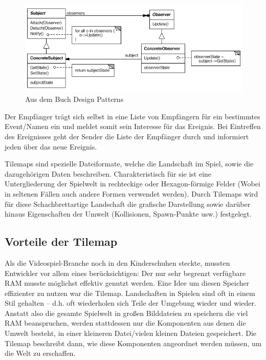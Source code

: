 \begin{figure}[H]
 \centering
  \includegraphics[width=15cm]{resources/observer_pattern}
  \caption{Aus dem Buch Design Patterns \cite[Seite 326ff]{gamma2011patterns}}
  \label{fig:observer_pattern} 
\end{figure}

Der Empfänger trägt sich selbst in eine Liste von Empfängern für ein bestimmtes Event/Namen ein und meldet somit sein Interesse für das Ereignis. Bei Eintreffen des Ereignisses geht der Sender die Liste der Empfänger durch und informiert jeden über das neue Ereignis.



\label{sec:2_Tilemaps}

Tilemaps  sind spezielle Dateiformate, welche die Landschaft im Spiel, sowie die dazugehörigen Daten beschreiben. Charakteristisch für sie ist eine Untergliederung der Spielwelt in rechteckige oder Hexagon-förmige Felder (Wobei in seltenen Fällen auch andere Formen verwendet werden). Durch Tilemaps wird für diese Schachbrettartige Landschaft die grafische Darstellung sowie darüber hinaus Eigenschaften der Umwelt (Kollisionen, Spawn-Punkte usw.) festgelegt.

\subsection{Vorteile der Tilemap}
Als die Videospiel-Branche noch in den Kinderschuhen steckte, mussten Entwickler vor allem eines berücksichtigen: Der nur sehr begrenzt verfügbare RAM musste möglichst effektiv genutzt werden. Eine Idee um diesen Speicher effizienter zu nutzen war die Tilemap. Landschaften in Spielen sind oft in einem Stil gehalten – d.h. oft wiederholen sich Teile der Umgebung wieder und wieder. Anstatt also die gesamte Spielwelt in großen Bilddateien zu speichern die viel RAM beanspruchen, werden stattdessen nur die Komponenten aus denen die Umwelt besteht, in einer kleineren Datei/vielen kleinen Dateien gespeichert. Die Tilemap beschreibt dann, wie diese Komponenten angeordnet werden müssen, um die Welt zu erschaffen.

